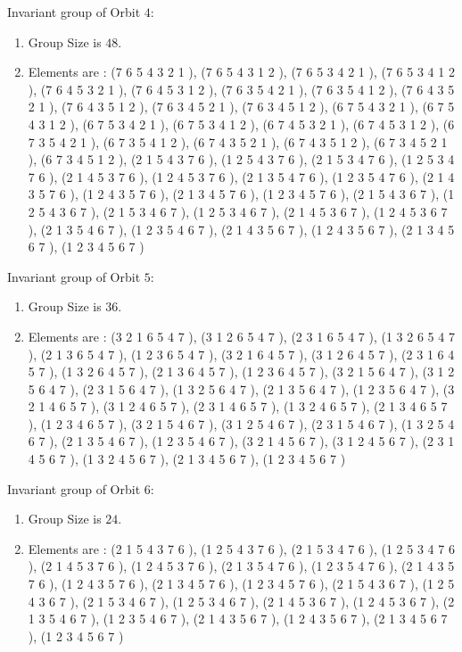 \documentclass[12pt]{article}
\begin{document}
Invariant group of Orbit $4$:
\begin{enumerate}
\item Group Size is $48$.
\item Elements are : (7 6 5 4 3 2 1  ), (7 6 5 4 3 1 2  ), (7 6 5 3 4 2 1  ), (7 6 5 3 4 1 2  ), (7 6 4 5 3 2 1  ), (7 6 4 5 3 1 2  ), (7 6 3 5 4 2 1  ), (7 6 3 5 4 1 2  ), (7 6 4 3 5 2 1  ), (7 6 4 3 5 1 2  ), (7 6 3 4 5 2 1  ), (7 6 3 4 5 1 2  ), (6 7 5 4 3 2 1  ), (6 7 5 4 3 1 2  ), (6 7 5 3 4 2 1  ), (6 7 5 3 4 1 2  ), (6 7 4 5 3 2 1  ), (6 7 4 5 3 1 2  ), (6 7 3 5 4 2 1  ), (6 7 3 5 4 1 2  ), (6 7 4 3 5 2 1  ), (6 7 4 3 5 1 2  ), (6 7 3 4 5 2 1  ), (6 7 3 4 5 1 2  ), (2 1 5 4 3 7 6  ), (1 2 5 4 3 7 6  ), (2 1 5 3 4 7 6  ), (1 2 5 3 4 7 6  ), (2 1 4 5 3 7 6  ), (1 2 4 5 3 7 6  ), (2 1 3 5 4 7 6  ), (1 2 3 5 4 7 6  ), (2 1 4 3 5 7 6  ), (1 2 4 3 5 7 6  ), (2 1 3 4 5 7 6  ), (1 2 3 4 5 7 6  ), (2 1 5 4 3 6 7  ), (1 2 5 4 3 6 7  ), (2 1 5 3 4 6 7  ), (1 2 5 3 4 6 7  ), (2 1 4 5 3 6 7  ), (1 2 4 5 3 6 7  ), (2 1 3 5 4 6 7  ), (1 2 3 5 4 6 7  ), (2 1 4 3 5 6 7  ), (1 2 4 3 5 6 7  ), (2 1 3 4 5 6 7  ), (1 2 3 4 5 6 7  )
\end{enumerate}
Invariant group of Orbit $5$:
\begin{enumerate}
\item Group Size is $36$.
\item Elements are : (3 2 1 6 5 4 7  ), (3 1 2 6 5 4 7  ), (2 3 1 6 5 4 7  ), (1 3 2 6 5 4 7  ), (2 1 3 6 5 4 7  ), (1 2 3 6 5 4 7  ), (3 2 1 6 4 5 7  ), (3 1 2 6 4 5 7  ), (2 3 1 6 4 5 7  ), (1 3 2 6 4 5 7  ), (2 1 3 6 4 5 7  ), (1 2 3 6 4 5 7  ), (3 2 1 5 6 4 7  ), (3 1 2 5 6 4 7  ), (2 3 1 5 6 4 7  ), (1 3 2 5 6 4 7  ), (2 1 3 5 6 4 7  ), (1 2 3 5 6 4 7  ), (3 2 1 4 6 5 7  ), (3 1 2 4 6 5 7  ), (2 3 1 4 6 5 7  ), (1 3 2 4 6 5 7  ), (2 1 3 4 6 5 7  ), (1 2 3 4 6 5 7  ), (3 2 1 5 4 6 7  ), (3 1 2 5 4 6 7  ), (2 3 1 5 4 6 7  ), (1 3 2 5 4 6 7  ), (2 1 3 5 4 6 7  ), (1 2 3 5 4 6 7  ), (3 2 1 4 5 6 7  ), (3 1 2 4 5 6 7  ), (2 3 1 4 5 6 7  ), (1 3 2 4 5 6 7  ), (2 1 3 4 5 6 7  ), (1 2 3 4 5 6 7  )
\end{enumerate}
Invariant group of Orbit $6$:
\begin{enumerate}
\item Group Size is $24$.
\item Elements are : (2 1 5 4 3 7 6  ), (1 2 5 4 3 7 6  ), (2 1 5 3 4 7 6  ), (1 2 5 3 4 7 6  ), (2 1 4 5 3 7 6  ), (1 2 4 5 3 7 6  ), (2 1 3 5 4 7 6  ), (1 2 3 5 4 7 6  ), (2 1 4 3 5 7 6  ), (1 2 4 3 5 7 6  ), (2 1 3 4 5 7 6  ), (1 2 3 4 5 7 6  ), (2 1 5 4 3 6 7  ), (1 2 5 4 3 6 7  ), (2 1 5 3 4 6 7  ), (1 2 5 3 4 6 7  ), (2 1 4 5 3 6 7  ), (1 2 4 5 3 6 7  ), (2 1 3 5 4 6 7  ), (1 2 3 5 4 6 7  ), (2 1 4 3 5 6 7  ), (1 2 4 3 5 6 7  ), (2 1 3 4 5 6 7  ), (1 2 3 4 5 6 7  )
\end{enumerate}
\end{document}
